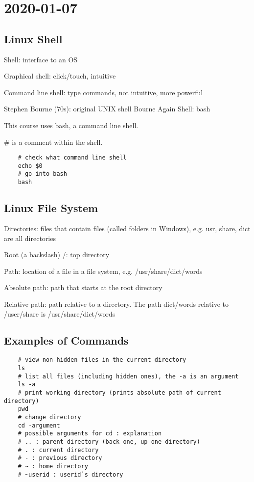 \section{2020-01-07}

\subsection{Linux Shell}

Shell: interface to an OS

Graphical shell: click/touch, intuitive

Command line shell: type commands, not intuitive, more powerful

Stephen Bourne (70s): original UNIX shell
Bourne Again Shell: bash

This course uses bash, a command line shell.

\# is a comment within the shell.

\begin{lstlisting}
    # check what command line shell
    echo $0
    # go into bash
    bash
\end{lstlisting}

\subsection{Linux File System}
Directories: files that contain files (called folders in Windows), e.g.
usr, share, dict are all directories

Root (a backslash) /: top directory

Path: location of a file in a file system, e.g. /usr/share/dict/words

Absolute path: path that starts at the root directory

Relative path: path relative to a directory.
The path dict/words relative to /user/share is /usr/share/dict/words

\subsection{Examples of Commands}

\begin{lstlisting}
    # view non-hidden files in the current directory
    ls
    # list all files (including hidden ones), the -a is an argument
    ls -a
    # print working directory (prints absolute path of current directory)
    pwd
    # change directory
    cd -argument
    # possible arguments for cd : explanation
    # .. : parent directory (back one, up one directory)
    # . : current directory
    # - : previous directory
    # ~ : home directory
    # ~userid : userid`s directory
\end{lstlisting}
